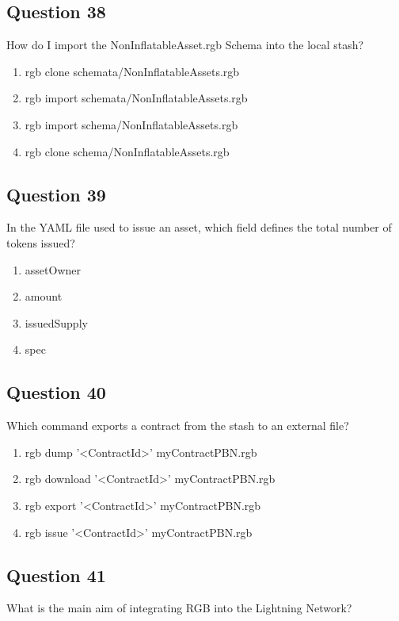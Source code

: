 \documentclass[12pt,a4paper]{article}
\begin{document}
\subsection*{Question 38}
How do I import the NonInflatableAsset.rgb Schema into the local stash?

\begin{enumerate}[label=\Alph*., leftmargin=*]
\item rgb clone schemata/NonInflatableAssets.rgb
\item rgb import schemata/NonInflatableAssets.rgb
\item rgb import schema/NonInflatableAssets.rgb
\item rgb clone schema/NonInflatableAssets.rgb
\end{enumerate}

\bigskip


\subsection*{Question 39}
In the YAML file used to issue an asset, which field defines the total number of tokens issued?

\begin{enumerate}[label=\Alph*., leftmargin=*]
\item assetOwner
\item amount
\item issuedSupply
\item spec
\end{enumerate}

\bigskip


\subsection*{Question 40}
Which command exports a contract from the stash to an external file?

\begin{enumerate}[label=\Alph*., leftmargin=*]
\item rgb dump '<ContractId>' myContractPBN.rgb
\item rgb download '<ContractId>' myContractPBN.rgb
\item rgb export '<ContractId>' myContractPBN.rgb
\item rgb issue '<ContractId>' myContractPBN.rgb
\end{enumerate}

\bigskip


\subsection*{Question 41}
What is the main aim of integrating RGB into the Lightning Network?
\end{document}
